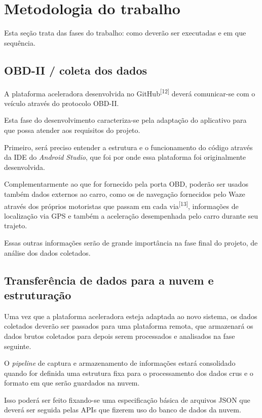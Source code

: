 \chapter{Metodologia do trabalho}
\label{CAP3}

Esta seção trata das fases do trabalho: como deverão ser executadas e em que sequência.



\section{OBD-II / coleta dos dados}
A plataforma aceleradora desenvolvida no GitHub\textsuperscript{[12]} deverá comunicar-se com o veículo através do protocolo OBD-II.

Esta fase do desenvolvimento caracteriza-se pela adaptação do aplicativo para que possa atender aos requisitos do projeto.

Primeiro, será preciso entender a estrutura e o funcionamento do código através da IDE do \textit{Android Studio}, que foi por onde essa plataforma foi originalmente desenvolvida.

Complementarmente ao que for fornecido pela porta OBD, poderão ser usados também dados externos ao carro, como os de navegação fornecidos pelo Waze através dos próprios motoristas que passam em cada via\textsuperscript{[13]}, informações de localização via GPS e também a aceleração desempenhada pelo carro durante seu trajeto.

Essas outras informações serão de grande importância na fase final do projeto, de análise dos dados coletados.

\section{Transferência de dados para a nuvem e estruturação}
Uma vez que a plataforma aceleradora esteja adaptada ao novo sistema, os dados coletados deverão ser passados para uma plataforma remota, que armazenará os dados brutos coletados para depois serem processados e analisados na fase seguinte.

O \textit{pipeline} de captura e armazenamento de informações estará consolidado quando for definida uma estrutura fixa para o processamento dos dados crus e o formato em que serão guardados na nuvem.

Isso poderá ser feito fixando-se uma especificação básica de arquivos JSON que deverá ser seguida pelas APIs que fizerem uso do banco de dados da nuvem.

